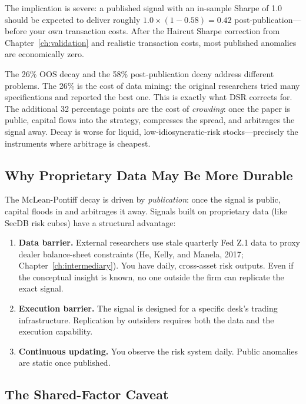 The implication is severe: a published signal with an in-sample Sharpe of 1.0 should be expected to deliver roughly $1.0 \times (1 - 0.58) = 0.42$ post-publication---before your own transaction costs.  After the Haircut Sharpe correction from Chapter~\ref{ch:validation} and realistic transaction costs, most published anomalies are economically zero.

The 26\% OOS decay and the 58\% post-publication decay address different problems.  The 26\% is the cost of data mining: the original researchers tried many specifications and reported the best one.  This is exactly what DSR corrects for.  The additional 32 percentage points are the cost of \emph{crowding}: once the paper is public, capital flows into the strategy, compresses the spread, and arbitrages the signal away.  Decay is worse for liquid, low-idiosyncratic-risk stocks---precisely the instruments where arbitrage is cheapest.

\subsection{Why Proprietary Data May Be More Durable}

The McLean-Pontiff decay is driven by \emph{publication}: once the signal is public, capital floods in and arbitrages it away.  Signals built on proprietary data (like SecDB risk cubes) have a structural advantage:

\begin{enumerate}[nosep]
  \item \textbf{Data barrier.}  External researchers use stale quarterly Fed Z.1 data to proxy dealer balance-sheet constraints (He, Kelly, and Manela, 2017; Chapter~\ref{ch:intermediary}).  You have daily, cross-asset risk outputs.  Even if the conceptual insight is known, no one outside the firm can replicate the exact signal.
  \item \textbf{Execution barrier.}  The signal is designed for a specific desk's trading infrastructure.  Replication by outsiders requires both the data and the execution capability.
  \item \textbf{Continuous updating.}  You observe the risk system daily.  Public anomalies are static once published.
\end{enumerate}

\subsection{The Shared-Factor Caveat}

